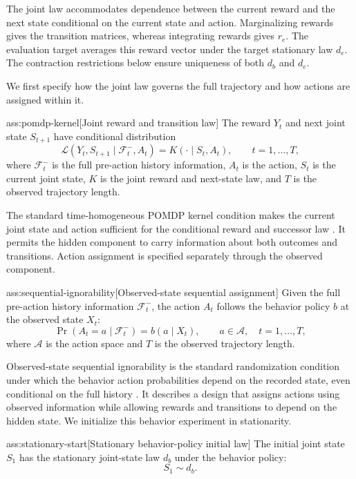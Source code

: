 The joint law accommodates dependence between the current reward and the next state conditional on the current state and action. Marginalizing rewards gives the transition matrices, whereas integrating rewards gives \(r_e\). The evaluation target averages this reward vector under the target stationary law \(d_e\). The contraction restrictions below ensure uniqueness of both \(d_b\) and \(d_e\).

We first specify how the joint law governs the full trajectory and how actions are assigned within it.

\begin{assumptionv}{ass:pomdp-kernel}[Joint reward and transition law]
The reward \(Y_t\) and next joint state \(S_{t+1}\) have conditional distribution
\[
\mathcal L(Y_t,S_{t+1}\mid\mathcal F_t^-,A_t)
=
K(\cdot\mid S_t,A_t),
\qquad t=1,\ldots,T,
\]
where \(\mathcal F_t^-\) is the full pre-action history information, \(A_t\) is the action, \(S_t\) is the current joint state, \(K\) is the joint reward and next-state law, and \(T\) is the observed trajectory length.
\end{assumptionv}

The standard time-homogeneous POMDP kernel condition makes the current joint state and action sufficient for the conditional reward and successor law \citep{HuWager2023}. It permits the hidden component to carry information about both outcomes and transitions. Action assignment is specified separately through the observed component.

\begin{assumptionv}{ass:sequential-ignorability}[Observed-state sequential assignment]
Given the full pre-action history information \(\mathcal F_t^-\), the action \(A_t\) follows the behavior policy \(b\) at the observed state \(X_t\):
\[
\Pr(A_t=a\mid\mathcal F_t^-)=b(a\mid X_t),
\qquad a\in\mathcal A,\quad t=1,\ldots,T,
\]
where \(\mathcal A\) is the action space and \(T\) is the observed trajectory length.
\end{assumptionv}

Observed-state sequential ignorability is the standard randomization condition under which the behavior action probabilities depend on the recorded state, even conditional on the full history \citep{HuWager2023}. It describes a design that assigns actions using observed information while allowing rewards and transitions to depend on the hidden state. We initialize this behavior experiment in stationarity.

\begin{assumptionv}{ass:stationary-start}[Stationary behavior-policy initial law]
The initial joint state \(S_1\) has the stationary joint-state law \(d_b\) under the behavior policy:
\[
S_1\sim d_b.
\]
\end{assumptionv}

